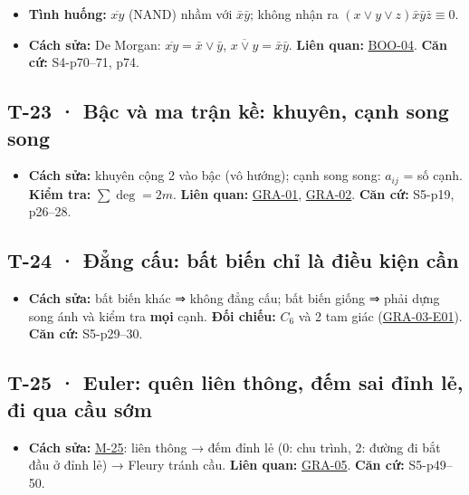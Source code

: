\documentclass[
  10pt,
  twoside,openany]{book}
\providecommand{\tightlist}{%
  \setlength{\itemsep}{0pt}\setlength{\parskip}{0pt}}
\begin{document}
\begin{itemize}
\tightlist
\item
  \textbf{Tình huống:} \(\overline{xy}\) (NAND) nhầm với
  \(\bar x\bar y\); không nhận ra
  \((x\vee y\vee z)\bar x\bar y\bar z\equiv0\).
\item
  \textbf{Cách sửa:} De Morgan: \(\overline{xy}=\bar x\vee\bar y\),
  \(\overline{x\vee y}=\bar x\bar y\). \textbf{Liên quan:}
  \protect\hyperlink{BOO-04}{BOO-04}. \textbf{Căn cứ:} S4-p70--71, p74.
\end{itemize}

\hypertarget{T-23}{%
\subsection{T-23 · Bậc và ma trận kề: khuyên, cạnh song
song}\label{T-23}}

\begin{itemize}
\tightlist
\item
  \textbf{Cách sửa:} khuyên cộng 2 vào bậc (vô hướng); cạnh song song:
  \(a_{ij}\) = số cạnh. \textbf{Kiểm tra:} \(\sum\deg=2m\). \textbf{Liên
  quan:} \protect\hyperlink{GRA-01}{GRA-01},
  \protect\hyperlink{GRA-02}{GRA-02}. \textbf{Căn cứ:} S5-p19, p26--28.
\end{itemize}

\hypertarget{T-24}{%
\subsection{T-24 · Đẳng cấu: bất biến chỉ là điều kiện cần}\label{T-24}}

\begin{itemize}
\tightlist
\item
  \textbf{Cách sửa:} bất biến khác ⇒ không đẳng cấu; bất biến giống ⇒
  phải dựng song ánh và kiểm tra \textbf{mọi} cạnh. \textbf{Đối chiếu:}
  \(C_6\) và 2 tam giác (\protect\hyperlink{GRA-03-E01}{GRA-03-E01}).
  \textbf{Căn cứ:} S5-p29--30.
\end{itemize}

\hypertarget{T-25}{%
\subsection{T-25 · Euler: quên liên thông, đếm sai đỉnh lẻ, đi qua cầu
sớm}\label{T-25}}

\begin{itemize}
\tightlist
\item
  \textbf{Cách sửa:} \protect\hyperlink{M-25}{M-25}: liên thông → đếm
  đỉnh lẻ (0: chu trình, 2: đường đi bắt đầu ở đỉnh lẻ) → Fleury tránh
  cầu. \textbf{Liên quan:} \protect\hyperlink{GRA-05}{GRA-05}.
  \textbf{Căn cứ:} S5-p49--50.
\end{itemize}
\end{document}
